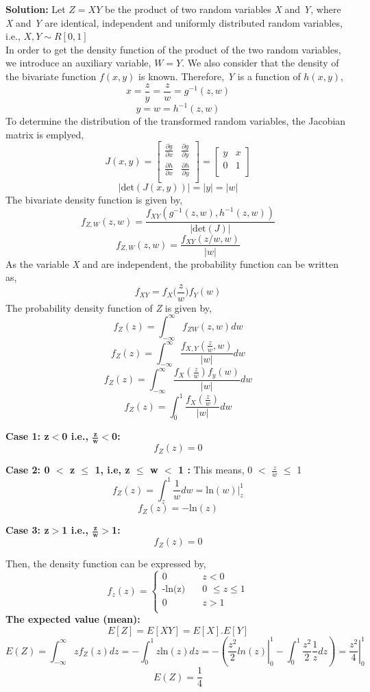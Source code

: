 \noindent \textbf{Solution:} 
\noindent Let $Z = XY$ be the product of two random variables \textit{X} and \textit{Y}, where \textit{X} and \textit{Y} are identical, independent and uniformly distributed random variables, i.e., $X, Y \sim R[0, 1]$ \\
\noindent In order to get the density function of the product of the two random variables, we introduce an auxiliary variable, $W = Y.$ We also consider that the density of the bivariate function $f(x, y)$ is known. Therefore, \textit{Y} is a function of $h(x, y)$,
$$ x = \frac{z}{y} = \frac{z}{w} = g^{-1}(z, w)  $$
$$ y = w = h^{-1}(z, w)  $$
\noindent To determine the distribution of the transformed random variables, the Jacobian matrix is emplyed,
\[J(x, y) =
\begin{bmatrix}
\frac{\partial g}{\partial x}  & \frac{\partial g}{\partial y}\\
\frac{\partial h}{\partial x}  &  \frac{\partial h}{\partial y}\\
\end{bmatrix}
=
\begin{bmatrix}
y & x\\
0 & 1\\ 
\end{bmatrix}
\]
$$|\text{det}(J(x, y))| = |y| = |w| $$
\noindent The bivariate density function is given by,
$$ f_{Z,W}(z,w) = \frac{f_{XY}(g^{-1}(z, w), h^{-1}(z, w))}{|\text{det} (J)|}     $$
$$ f_{Z,W}(z,w) = \frac{f_{XY}(z/w, w)}{|w|}     $$
\noindent As the variable \textit{X} and  are independent, the probability function can be written as,
$$ f_{XY} = f_X \bigg(\frac{z}{w}\bigg) f_Y(w)  $$
\noindent The probability density function of \textit{Z} is given by,
$$f_Z(z) = \int_{-\infty}^{\infty}f_{ZW}(z, w)dw$$
$$f_Z(z) = \int_{-\infty}^{\infty}\frac{f_{X, Y}(\frac{z}{w}, w)}{|w|} dw $$
$$f_Z(z) = \int_{-\infty}^{\infty}\frac{f_X(\frac{z}{w})f_y(w)}{|w|}dw $$
$$ f_Z(z)  = \int_0^1 \frac{f_X(\frac{z}{w})}{|w|}dw$$

\textbf{Case 1:   z$<$0 i.e.,  $\frac{\textbf{z}}{\textbf{w}}$$<$0:}
$$ f_Z(z)  = 0$$

\textbf{Case 2: 0 $<$ z $\leq$ 1, i.e,  z $\leq$ w $<$ 1 :}
\noindent This means,  0 $<$ $\frac{z}{w}$ $\leq$ 1
$$  f_Z(z) = \int_z^1 \frac{1}{w} dw = \left.\text{ln}(w)\right|_z^1 $$
$$  f_Z(z) = -\text{ln}(z)$$

\textbf{Case 3:   z$>$1 i.e.,  $\frac{\textbf{z}}{\textbf{w}}$$>$1:}
$$ f_Z(z)  = 0$$

\noindent Then, the density function can be expressed by,
\[f_z(z)=
	\begin{cases}
	\text{0}   &\quad\text{$z<0$}\\
	\text{-ln(z)} &\quad\text{0 $\leq z \leq $1}\\
	\text{0}   &\quad\text{$z>1$}\\
	\end{cases}
\]
\noindent \textbf{The expected value (mean):}
$$ E[Z] =  E[XY] = E[X].E[Y] $$
$$E(Z) = \int_{-\infty}^{\infty}zf_Z(z) dz = -\int_0^1z \text{ln}(z) dz = -\left(\left.\frac{z^2}{2}ln (z)\right|_0^1 - \int_0^1\frac{z^2}{2}\frac{1}{z}dz\right) = \left.\frac{z^2}{4}\right|_0^1$$
$$E(Z) = \frac{1}{4}$$

